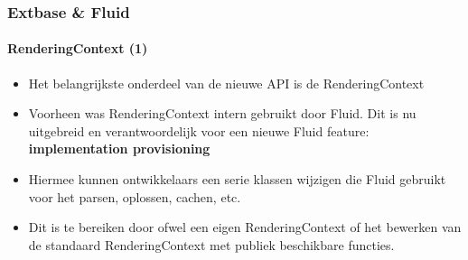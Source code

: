 
\begin{frame}[fragile]
	\frametitle{Extbase \& Fluid}
	\framesubtitle{RenderingContext (1)}

	\lstset{basicstyle=\tiny\ttfamily}

	\begin{itemize}

		\item Het belangrijkste onderdeel van de nieuwe API is de RenderingContext

		\item Voorheen was RenderingContext intern gebruikt door Fluid. Dit is nu uitgebreid
			en verantwoordelijk voor een nieuwe Fluid feature:
			\textbf{implementation provisioning}

		\item Hiermee kunnen ontwikkelaars een serie klassen wijzigen die Fluid gebruikt voor
			het parsen, oplossen, cachen, etc.

		\item Dit is te bereiken door ofwel een eigen RenderingContext of
			het bewerken van de standaard RenderingContext met publiek beschikbare functies.

	\end{itemize}

\end{frame}


